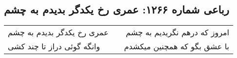 \begin{center}
\section*{رباعی شماره ۱۲۶۶: عمری رخ یکدگر بدیدم به چشم}
\label{sec:1266}
\begin{longtable}{l p{0.5cm} r}
عمری رخ یکدگر بدیدم به چشم
&&
امروز که درهم نگریدیم به چشم
\\
وانگه گوئی دراز تا چند کشی
&&
با عشق بگو که همچنین میکشدم
\\
\end{longtable}
\end{center}
